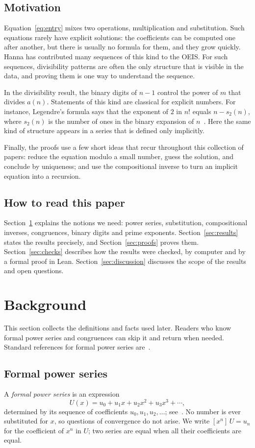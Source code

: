 \documentclass[11pt,a4paper]{article}
\theoremstyle{definition}
\theoremstyle{remark}
\newcommand{\coeff}[2]{[x^{#1}]\,#2}
\begin{document}
\subsection{Motivation}
Equation~\eqref{eq:entry} mixes two operations, multiplication and substitution. Such equations rarely have explicit
solutions: the coefficients can be computed one after another, but there is usually no formula for them, and they grow
quickly. Hanna has contributed many sequences of this kind to the OEIS. For such sequences, divisibility patterns are
often the only structure that is visible in the data, and proving them is one way to understand the sequence.

In the divisibility result, the binary digits of $n-1$ control the power of $m$ that divides $a(n)$. Statements of
this kind are classical for explicit numbers. For instance, Legendre's formula says that the exponent of $2$
in $n!$ equals $n-s_2(n)$, where $s_2(n)$ is the number of ones in the binary expansion of $n$~\cite{concrete}.
Here the same kind of structure appears in a series that is defined only implicitly.

Finally, the proofs use a few short ideas that recur throughout this collection of papers: reduce the equation modulo
a small number, guess the solution, and conclude by uniqueness; and use the compositional inverse to turn an implicit
equation into a recursion.

\subsection{How to read this paper}
Section~\ref{sec:background} explains the notions we need: power series, substitution, compositional inverses,
congruences, binary digits and prime exponents. Section~\ref{sec:results} states the results precisely, and
Section~\ref{sec:proofs} proves them. Section~\ref{sec:checks} describes how the results were checked, by computer and by
a formal proof in Lean. Section~\ref{sec:discussion} discusses the scope of the results and open questions.
\section{Background}\label{sec:background}
This section collects the definitions and facts used later. Readers who know formal power series and congruences can skip it and return when needed. Standard references for formal power series are~\cite{niven,stanley}.
\subsection{Formal power series}
A \emph{formal power series} is an expression
\[
U(x)=u_0+u_1x+u_2x^2+u_3x^3+\cdots ,
\]
determined by its sequence of coefficients $u_0,u_1,u_2,\dots$; see~\cite{niven,stanley}. No number is ever
substituted for $x$, so questions of convergence do not arise. We write $\coeff{n}{U}=u_n$ for the coefficient of $x^n$ in $U$; two series are equal
when all their coefficients are equal.
\end{document}
